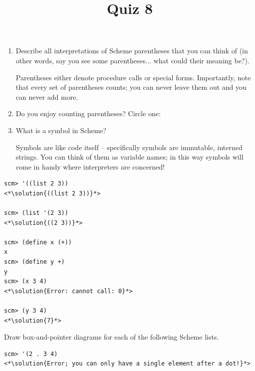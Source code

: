 \documentclass[twoside]{article}
\title{\sc Quiz 8 \solution{Solutions}}
\newcommand{\solution}[1]{{\color{red}#1}}
\newcommand\solution[1]{} %
\begin{document}
\thispagestyle{empty}
\maketitle

\begin{enumerate}

\begin{enumerate}
\item Describe all interpretations of Scheme parentheses that you can think of (in other words, say you see some parentheses... what could their meaning be?).

\solution{Parentheses either denote procedure calls or special forms. Importantly, note that every set of parentheses counts; you can never leave them out and you can never add more.}

\item Do you enjoy counting parentheses? Circle one:\:\:\solution{Yes}

\vspace{0.02in}

\vspace{0.02in}

\item What is a symbol in Scheme?

\solution{Symbols are like code itself -- specifically symbols are immutable, interned strings. You can think of them as variable names; in this way symbols will come in handy where interpreters are concerned!}

\end{enumerate}


\begin{lstlisting}
scm> '((list 2 3))
<*\solution{((list 2 3))}*>

scm> (list '(2 3))
<*\solution{((2 3))}*>

scm> (define x (+))
x
scm> (define y +)
y
scm> (x 3 4)
<*\solution{Error: cannot call: 0}*>

scm> (y 3 4)
<*\solution{7}*>
\end{lstlisting}


Draw box-and-pointer diagrams for each of the following Scheme lists.

\begin{lstlisting}
scm> '(2 . 3 4)
<*\solution{Error; you can only have a single element after a dot!}*>


\end{lstlisting}
\end{enumerate}
\end{document}
